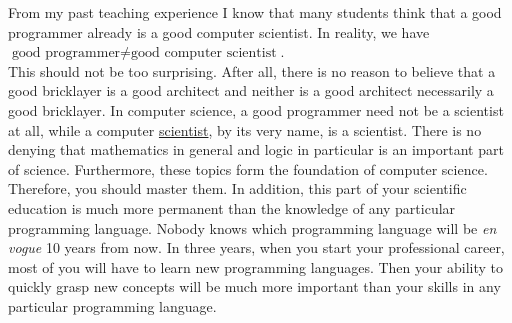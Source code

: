 From my past teaching experience I know that many students think that a good programmer already is a
good computer scientist.  In reality, we have
\\[0.2cm]
\hspace*{1.3cm}
$\textrm{good programmer} \not= \textrm{good computer scientist}$.
\\[0.2cm]
This should not be too surprising.  After all, there is no reason to believe that a good bricklayer is a good
architect and neither is a good architect necessarily a good bricklayer.
In computer science, a good programmer need not be a scientist at all, while a {\color{blue}computer
  \underline{scientist}}, by its very name, is a {\color{blue}scientist}.  
There is no denying that {\color{blue}mathematics} in general and 
{\color{blue}logic} in particular is an important part of science.  Furthermore, these topics form the
foundation of computer science.  Therefore, you should master them.  In addition, this
part of your scientific education is much more permanent than the knowledge of any particular programming
language.  Nobody knows which programming language will be \emph{en vogue} 10 years from now.  In three 
years, when you start your professional career, most of you will have to learn new
programming languages.   Then your ability to quickly grasp new concepts will be much more important than your
skills in any particular programming language. 

